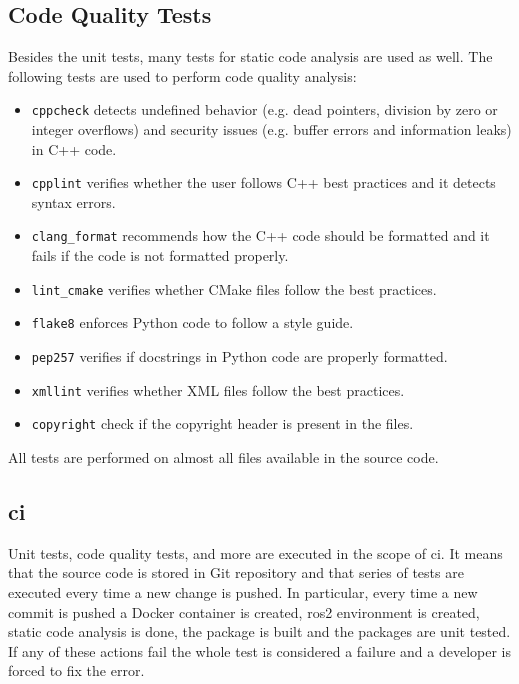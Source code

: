 \subsection{Code Quality Tests}
Besides the unit tests, many tests for static code analysis are used as well.
The following tests are used to perform code quality analysis:
\begin{itemize}
    \item \texttt{cppcheck} detects undefined behavior (e.g. dead pointers, division by zero or integer overflows) and security issues (e.g. buffer errors and information leaks) in C++ code.
    \item \texttt{cpplint} verifies whether the user follows C++ best practices and it detects syntax errors.
    \item \texttt{clang\_format} recommends how the C++ code should be formatted and it fails if the code is not formatted properly. 
    \item \texttt{lint\_cmake} verifies whether CMake files follow the best practices.
    \item \texttt{flake8} enforces Python code to follow a style guide.
    \item \texttt{pep257} verifies if docstrings in Python code are properly formatted.
    \item \texttt{xmllint} verifies whether XML files follow the best practices.
    \item \texttt{copyright} check if the copyright header is present in the files.
\end{itemize}

All tests are performed on almost all files available in the source code. 

\subsection{\acl{ci}}
Unit tests, code quality tests, and more are executed in the scope of \ac{ci}.
It means that the source code is stored in Git repository and that series of tests are executed every time a new change is pushed.
In particular, every time a new commit is pushed a Docker container is created, \ac{ros2} environment is created, static code analysis is done, the package is built and the packages are unit tested.
If any of these actions fail the whole test is considered a failure and a developer is forced to fix the error.

